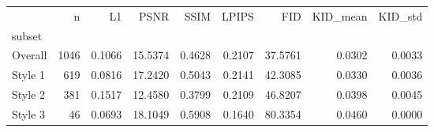 \begin{tabular}{lrrrrrrrr}
\toprule
 & n & L1 & PSNR & SSIM & LPIPS & FID & KID_mean & KID_std \\
subset &  &  &  &  &  &  &  &  \\
\midrule
Overall & 1046 & 0.1066 & 15.5374 & 0.4628 & 0.2107 & 37.5761 & 0.0302 & 0.0033 \\
Style 1 & 619 & 0.0816 & 17.2420 & 0.5043 & 0.2141 & 42.3085 & 0.0330 & 0.0036 \\
Style 2 & 381 & 0.1517 & 12.4580 & 0.3799 & 0.2109 & 46.8207 & 0.0398 & 0.0045 \\
Style 3 & 46 & 0.0693 & 18.1049 & 0.5908 & 0.1640 & 80.3354 & 0.0460 & 0.0000 \\
\bottomrule
\end{tabular}
